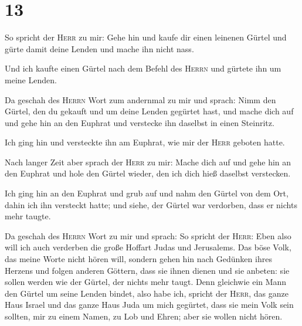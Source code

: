 \hypertarget{section-12}{%
\section{13}\label{section-12}}

 So spricht der \textsc{Herr} zu mir: Gehe hin und kaufe
dir einen leinenen Gürtel und gürte damit deine Lenden und mache ihn
nicht nass.

 Und ich kaufte einen Gürtel nach dem Befehl des
\textsc{Herrn} und gürtete ihn um meine Lenden.

 Da geschah des \textsc{Herrn} Wort zum andernmal zu mir
und sprach:  Nimm den Gürtel, den du gekauft und um deine
Lenden gegürtet hast, und mache dich auf und gehe hin an den Euphrat und
verstecke ihn daselbst in einen Steinritz.

 Ich ging hin und versteckte ihn am Euphrat, wie mir der
\textsc{Herr} geboten hatte.

 Nach langer Zeit aber sprach der \textsc{Herr} zu mir:
Mache dich auf und gehe hin an den Euphrat und hole den Gürtel wieder,
den ich dich hieß daselbst verstecken.

 Ich ging hin an den Euphrat und grub auf und nahm den
Gürtel von dem Ort, dahin ich ihn versteckt hatte; und siehe, der Gürtel
war verdorben, dass er nichts mehr taugte.

 Da geschah des \textsc{Herrn} Wort zu mir und sprach:
 So spricht der \textsc{Herr}: Eben also will ich auch
verderben die große Hoffart Judas und Jerusalems.  Das
böse Volk, das meine Worte nicht hören will, sondern gehen hin nach
Gedünken ihres Herzens und folgen anderen Göttern, dass sie ihnen dienen
und sie anbeten: sie sollen werden wie der Gürtel, der nichts mehr
taugt.  Denn gleichwie ein Mann den Gürtel um seine
Lenden bindet, also habe ich, spricht der \textsc{Herr}, das ganze Haus
Israel und das ganze Haus Juda um mich gegürtet, dass sie mein Volk sein
sollten, mir zu einem Namen, zu Lob und Ehren; aber sie wollen nicht
hören.

